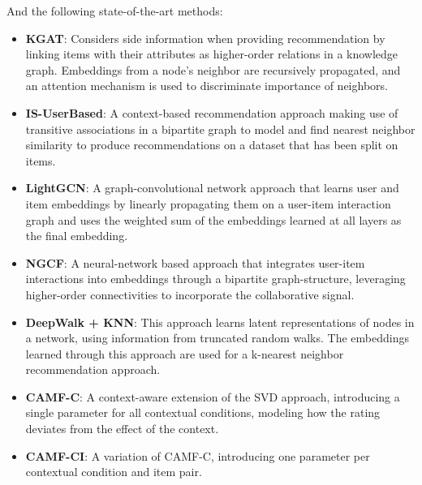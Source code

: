 And the following state-of-the-art methods:
\begin{itemize}
    \item \textbf{KGAT}: Considers side information when providing recommendation by linking items with their attributes as higher-order relations in a knowledge graph. Embeddings from a node's neighbor are recursively propagated, and an attention mechanism is used to discriminate importance of neighbors.
    \item \textbf{IS-UserBased}: A context-based recommendation approach making use of transitive associations in a bipartite graph to model and find nearest neighbor similarity to produce recommendations on a dataset that has been split on items.
    \item \textbf{LightGCN}: A graph-convolutional network approach that learns user and item embeddings by linearly propagating them on a user-item interaction graph and uses the weighted sum of the embeddings learned at all layers as the final embedding.
    \item \textbf{NGCF}: A neural-network based approach that integrates user-item interactions into embeddings through a bipartite graph-structure, leveraging higher-order connectivities to incorporate the collaborative signal.
    \item \textbf{DeepWalk + KNN}: This approach learns latent representations of nodes in a network, using information from truncated random walks. The embeddings learned through this approach are used for a k-nearest neighbor recommendation approach.
    \item \textbf{CAMF-C}: A context-aware extension of the SVD approach, introducing a single parameter for all contextual conditions, modeling how the rating deviates from the effect of the context.
    \item \textbf{CAMF-CI}: A variation of CAMF-C, introducing one parameter per contextual condition and item pair.
\end{itemize}


